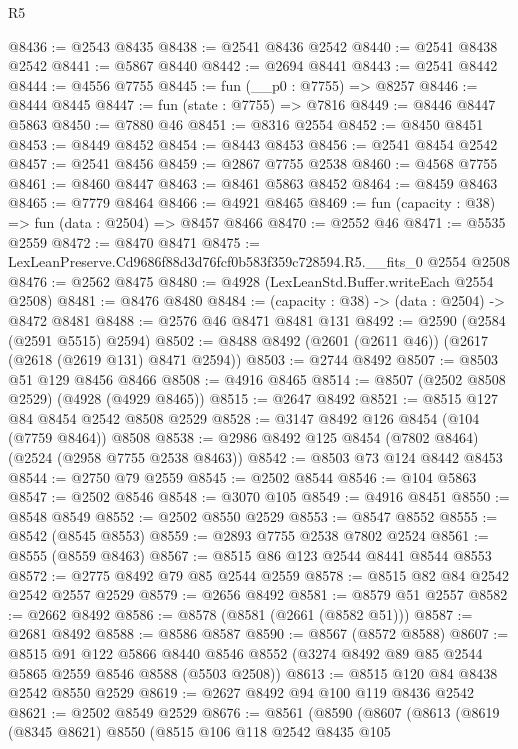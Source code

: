 \begin{lexlean}{R5}
\begin{coremodule}
@8436 := @2543 @8435
@8438 := @2541 @8436 @2542
@8440 := @2541 @8438 @2542
@8441 := @5867 @8440
@8442 := @2694 @8441
@8443 := @2541 @8442
@8444 := @4556 @7755
@8445 := fun (__p0 : @7755) => @8257
@8446 := @8444 @8445
@8447 := fun (state : @7755) => @7816
@8449 := @8446 @8447 @5863
@8450 := @7880 @46
@8451 := @8316 @2554
@8452 := @8450 @8451
@8453 := @8449 @8452
@8454 := @8443 @8453
@8456 := @2541 @8454 @2542
@8457 := @2541 @8456
@8459 := @2867 @7755 @2538
@8460 := @4568 @7755
@8461 := @8460 @8447
@8463 := @8461 @5863 @8452
@8464 := @8459 @8463
@8465 := @7779 @8464
@8466 := @4921 @8465
@8469 := fun (capacity : @38) => fun (data : @2504) => @8457 @8466
@8470 := @2552 @46
@8471 := @5535 @2559
@8472 := @8470 @8471
@8475 := LexLeanPreserve.Cd9686f88d3d76fcf0b583f359c728594.R5.__fits_0 @2554 @2508
@8476 := @2562 @8475
@8480 := @4928 (LexLeanStd.Buffer.writeEach @2554 @2508)
@8481 := @8476 @8480
@8484 := (capacity : @38) -> (data : @2504) -> @8472 @8481
@8488 := @2576 @46 @8471 @8481 @131
@8492 := @2590 (@2584 (@2591 @5515) @2594)
@8502 := @8488 @8492 (@2601 (@2611 @46)) (@2617 (@2618 (@2619 @131) @8471 @2594))
@8503 := @2744 @8492
@8507 := @8503 @51 @129 @8456 @8466
@8508 := @4916 @8465
@8514 := @8507 (@2502 @8508 @2529) (@4928 (@4929 @8465))
@8515 := @2647 @8492
@8521 := @8515 @127 @84 @8454 @2542 @8508 @2529
@8528 := @3147 @8492 @126 @8454 (@104 (@7759 @8464)) @8508
@8538 := @2986 @8492 @125 @8454 (@7802 @8464) (@2524 (@2958 @7755 @2538 @8463))
@8542 := @8503 @73 @124 @8442 @8453
@8544 := @2750 @79 @2559
@8545 := @2502 @8544
@8546 := @104 @5863
@8547 := @2502 @8546
@8548 := @3070 @105
@8549 := @4916 @8451
@8550 := @8548 @8549
@8552 := @2502 @8550 @2529
@8553 := @8547 @8552
@8555 := @8542 (@8545 @8553)
@8559 := @2893 @7755 @2538 @7802 @2524
@8561 := @8555 (@8559 @8463)
@8567 := @8515 @86 @123 @2544 @8441 @8544 @8553
@8572 := @2775 @8492 @79 @85 @2544 @2559
@8578 := @8515 @82 @84 @2542 @2542 @2557 @2529
@8579 := @2656 @8492
@8581 := @8579 @51 @2557
@8582 := @2662 @8492
@8586 := @8578 (@8581 (@2661 (@8582 @51)))
@8587 := @2681 @8492
@8588 := @8586 @8587
@8590 := @8567 (@8572 @8588)
@8607 := @8515
    @91
    @122
    @5866
    @8440
    @8546
    @8552
    (@3274 @8492 @89 @85 @2544 @5865 @2559 @8546 @8588 (@5503 @2508))
@8613 := @8515 @120 @84 @8438 @2542 @8550 @2529
@8619 := @2627 @8492 @94 @100 @119 @8436 @2542
@8621 := @2502 @8549 @2529
@8676 := @8561
    (@8590
      (@8607
        (@8613
          (@8619
            (@8345 @8621)
            @8550
            (@8515
              @106
              @118
              @2542
              @8435
              @105

\end{coremodule}
\end{lexlean}
